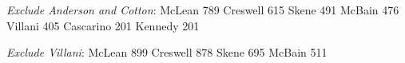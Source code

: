\begin{resultsiii}
\emph{Exclude Anderson and Cotton}: McLean 789 Creswell 615 Skene 491 McBain 476 Villani 405 Cascarino 201 Kennedy 201




\emph{Exclude Villani}: McLean 899 Creswell 878 Skene 695 McBain 511



\end{resultsiii}
